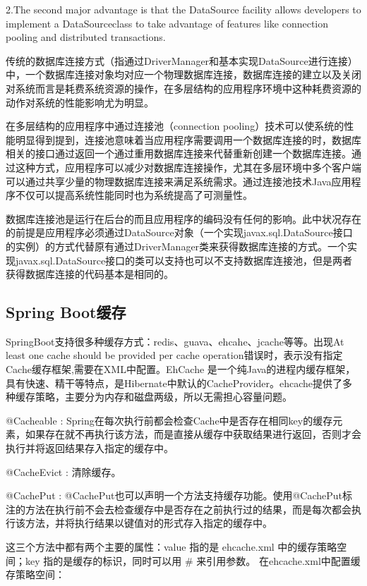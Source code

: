 \documentclass[letter]{book}
\begin{document}
2.The second major advantage is that the DataSource facility allows developers to implement a DataSourceclass to take advantage of features like connection pooling and distributed transactions.

传统的数据库连接方式（指通过DriverManager和基本实现DataSource进行连接）中，一个数据库连接对象均对应一个物理数据库连接，数据库连接的建立以及关闭对系统而言是耗费系统资源的操作，在多层结构的应用程序环境中这种耗费资源的动作对系统的性能影响尤为明显。

在多层结构的应用程序中通过连接池（connection pooling）技术可以使系统的性能明显得到提到，连接池意味着当应用程序需要调用一个数据库连接的时，数据库相关的接口通过返回一个通过重用数据库连接来代替重新创建一个数据库连接。通过这种方式，应用程序可以减少对数据库连接操作，尤其在多层环境中多个客户端可以通过共享少量的物理数据库连接来满足系统需求。通过连接池技术Java应用程序不仅可以提高系统性能同时也为系统提高了可测量性。

数据库连接池是运行在后台的而且应用程序的编码没有任何的影响。此中状况存在的前提是应用程序必须通过DataSource对象（一个实现javax.sql.DataSource接口的实例）的方式代替原有通过DriverManager类来获得数据库连接的方式。一个实现javax.sql.DataSource接口的类可以支持也可以不支持数据库连接池，但是两者获得数据库连接的代码基本是相同的。

\subsection{Spring Boot缓存}

SpringBoot支持很多种缓存方式：redis、guava、ehcahe、jcache等等。出现At least one cache should be provided per cache operation错误时，表示没有指定Cache缓存框架,需要在XML中配置。EhCache 是一个纯Java的进程内缓存框架，具有快速、精干等特点，是Hibernate中默认的CacheProvider。ehcache提供了多种缓存策略，主要分为内存和磁盘两级，所以无需担心容量问题。

@Cacheable : Spring在每次执行前都会检查Cache中是否存在相同key的缓存元素，如果存在就不再执行该方法，而是直接从缓存中获取结果进行返回，否则才会执行并将返回结果存入指定的缓存中。 
 
@CacheEvict : 清除缓存。 

@CachePut : @CachePut也可以声明一个方法支持缓存功能。使用@CachePut标注的方法在执行前不会去检查缓存中是否存在之前执行过的结果，而是每次都会执行该方法，并将执行结果以键值对的形式存入指定的缓存中。 

这三个方法中都有两个主要的属性：value 指的是 ehcache.xml 中的缓存策略空间；key 指的是缓存的标识，同时可以用 \# 来引用参数。
在ehcache.xml中配置缓存策略空间：
\end{document}
